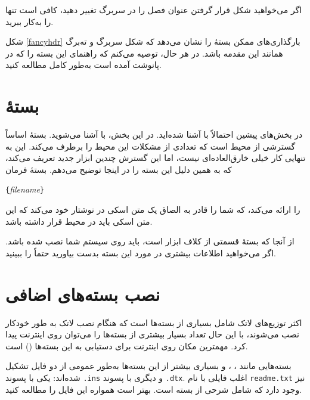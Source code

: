 {اگر می‌خواهید شکل قرار گرفتن عنوان فصل را در سربرگ تغییر دهید، کافی است تنها 
 را به‌کار ببرید. 

 
شکل 
\ref{fancyhdr}
بارگذاری‌های ممکن بستهٔ  را نشان می‌دهد که شکل سربرگ و ته‌برگ همانند این مقدمه باشد. در هر حال، توصیه می‌کنم که راهنمای این بسته را که در پانوشت آمده است به‌طور کامل مطالعه کنید.
\section{\texorpdfstring{بستهٔ }{بستهٔ verbatim}}
در بخش‌های پیشین احتمالاً با   آشنا شده‌اید. در این بخش، با  
آشنا می‌شوید. بستهٔ  اساساً گسترشی از محیط  است که تعدادی از مشکلات این محیط را برطرف می‌کند. این به‌ تنهایی کار خیلی خارق‌العاده‌ای نیست، اما این گسترش چندین ابزار جدید تعریف می‌کند، که به همین دلیل این بسته را در اینجا توضیح می‌دهم. بستهٔ  فرمان 

\begin{lscommand}
\verb|{|\emph{filename}\verb|}|
\end{lscommand}

\noindent را ارائه می‌کند، که شما را قادر به الصاق یک متن اسکی در نوشتار‌ خود می‌کند که این متن اسکی باید در محیط  قرار داشته باشد.

از آنجا که بستهٔ  قسمتی از کلاف ابزار است، باید روی سیستم شما نصب شده باشد. اگر می‌خواهید اطلاعات بیشتری در مورد این بسته بدست بیاورید حتماً  
\cite{verbatim} را ببینید.
\section{نصب بسته‌های اضافی}

اکثر توزیع‌های لاتک شامل بسیاری از بسته‌ها است که هنگام نصب لاتک به طور خودکار نصب می‌شوند، با این حال تعداد بسیار بیشتری از بسته‌ها را می‌توان روی اینترنت پیدا کرد. مهمترین مکان روی اینترنت برای دستیابی به این بسته‌ها  () است.

بسته‌هایی مانند ، ، و بسیاری بیشتر از این بسته‌ها به‌طور عمومی از دو فایل تشکیل شده‌اند: یکی با پسوند \texttt{.ins} و دیگری با پسوند \texttt{.dtx}. اغلب فایلی با نام  \texttt{readme.txt} نیز وجود دارد که شامل شرحی از بسته است. بهتر است همواره این فایل را مطالعه کنید.

}
